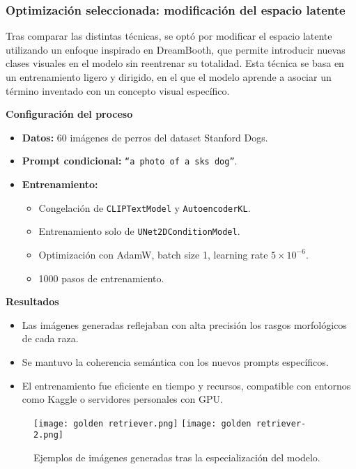 \subsubsection{Optimización seleccionada: modificación del espacio latente}
Tras comparar las distintas técnicas, se optó por modificar el espacio latente utilizando un enfoque inspirado en DreamBooth, que permite introducir nuevas clases visuales en el modelo sin reentrenar su totalidad. Esta técnica se basa en un entrenamiento ligero y dirigido, en el que el modelo aprende a asociar un término inventado con un concepto visual específico.

\textbf{Configuración del proceso}  
\begin{itemize}
\item \textbf{Datos:} 60 imágenes de perros del dataset Stanford Dogs.
\item \textbf{Prompt condicional:} \texttt{``a photo of a sks dog''}.
\item \textbf{Entrenamiento:}
\begin{itemize}
\item Congelación de \texttt{CLIPTextModel} y \texttt{AutoencoderKL}.
\item Entrenamiento solo de \texttt{UNet2DConditionModel}.
\item Optimización con AdamW, batch size 1, learning rate $5\times10^{-6}$.
\item 1000 pasos de entrenamiento.
\end{itemize}
\end{itemize}

\textbf{Resultados}  
\begin{itemize}
\item Las imágenes generadas reflejaban con alta precisión los rasgos morfológicos de cada raza.
\item Se mantuvo la coherencia semántica con los nuevos prompts específicos.
\item El entrenamiento fue eficiente en tiempo y recursos, compatible con entornos como Kaggle o servidores personales con GPU.
\end{itemize}

\begin{figure}[H]
\centering
\texttt{[image: golden retriever.png]}
\hfill
\texttt{[image: golden retriever-2.png]}
\caption{Ejemplos de imágenes generadas tras la especialización del modelo.}
\label{fig:latent-space-optimization}
\end{figure}

